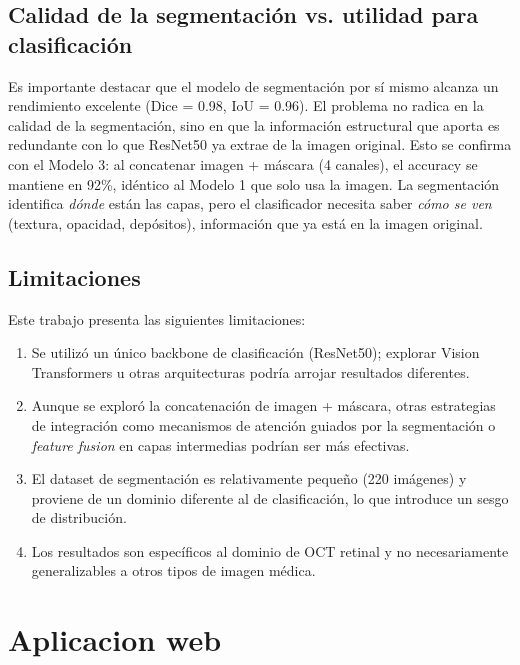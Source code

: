 \documentclass[journal, twocolumn]{IEEEtran}
\begin{document}
\subsection{Calidad de la segmentación vs. utilidad para clasificación}

Es importante destacar que el modelo de segmentación por sí mismo alcanza un rendimiento excelente (Dice = 0.98, IoU = 0.96). El problema no radica en la calidad de la segmentación, sino en que la información estructural que aporta es redundante con lo que ResNet50 ya extrae de la imagen original. Esto se confirma con el Modelo 3: al concatenar imagen + máscara (4 canales), el accuracy se mantiene en 92\%, idéntico al Modelo 1 que solo usa la imagen. La segmentación identifica \textit{dónde} están las capas, pero el clasificador necesita saber \textit{cómo se ven} (textura, opacidad, depósitos), información que ya está en la imagen original.

\subsection{Limitaciones}

Este trabajo presenta las siguientes limitaciones:
\begin{enumerate}
	\item Se utilizó un único backbone de clasificación (ResNet50); explorar Vision Transformers u otras arquitecturas podría arrojar resultados diferentes.
	\item Aunque se exploró la concatenación de imagen + máscara, otras estrategias de integración como mecanismos de atención guiados por la segmentación o \textit{feature fusion} en capas intermedias podrían ser más efectivas.
	\item El dataset de segmentación es relativamente pequeño (220 imágenes) y proviene de un dominio diferente al de clasificación, lo que introduce un sesgo de distribución.
	\item Los resultados son específicos al dominio de OCT retinal y no necesariamente generalizables a otros tipos de imagen médica.
\end{enumerate}

\section{Aplicacion web}
\end{document}
